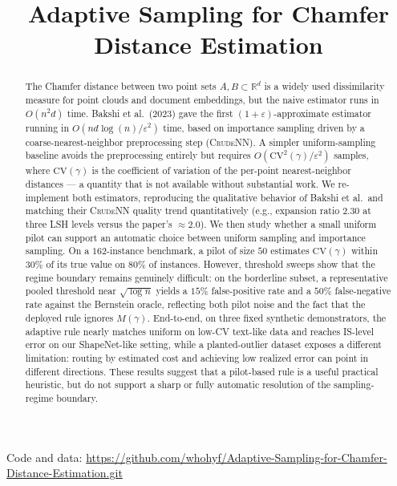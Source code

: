 \documentclass[conference]{IEEEtran}
\title{Adaptive Sampling for Chamfer Distance Estimation}
\author{
\IEEEauthorblockN{Cody Jiang}
\IEEEauthorblockA{
New York University\\
cody.jiang@nyu.edu}
\and
\IEEEauthorblockN{Yifan Hu}
\IEEEauthorblockA{
New York University\\
yh6416@nyu.edu}
}
\begin{document}
\maketitle

\begin{center}
\small
Code and data: \url{https://github.com/whohyf/Adaptive-Sampling-for-Chamfer-Distance-Estimation.git}
\end{center}

\begin{abstract}
The Chamfer distance between two point sets $A, B \subset \mathbb{R}^d$
is a widely used dissimilarity measure for point clouds and document
embeddings, but the naive estimator runs in $O(n^2 d)$ time. Bakshi
et al.\ (2023) gave the first $(1{+}\varepsilon)$-approximate estimator
running in $O(nd \log(n)/\varepsilon^2)$ time, based on importance
sampling driven by a coarse-nearest-neighbor preprocessing step
(\textsc{CrudeNN}). A simpler uniform-sampling baseline avoids the
preprocessing entirely but requires
$O(\mathrm{CV}^2(\gamma)/\varepsilon^2)$ samples, where
$\mathrm{CV}(\gamma)$ is the coefficient of variation of the per-point
nearest-neighbor distances --- a quantity that is not available
without substantial work. We re-implement both estimators, reproducing
the qualitative behavior of Bakshi et al.\ and matching their
\textsc{CrudeNN} quality trend quantitatively
(e.g., expansion ratio $2.30$ at three LSH levels versus the paper's
$\approx 2.0$). We then study whether a small uniform pilot can
support an automatic choice between uniform sampling and importance
sampling. On a $162$-instance benchmark, a pilot of size $50$
estimates $\mathrm{CV}(\gamma)$ within $30\%$ of its true value on
$80\%$ of instances. However, threshold sweeps show that the regime
boundary remains genuinely difficult: on the borderline subset, a
representative pooled threshold near $\sqrt{\log n}$ yields a
$15\%$ false-positive rate and a $50\%$ false-negative rate against
the Bernstein oracle, reflecting both pilot noise and the fact that
the deployed rule ignores $M(\gamma)$. End-to-end, on three fixed
synthetic demonstrators, the adaptive rule nearly matches uniform on
low-CV text-like data and reaches IS-level error on our ShapeNet-like
setting, while a planted-outlier dataset exposes a different
limitation: routing by estimated cost and achieving low realized error
can point in different directions. These results suggest that a
pilot-based rule is a useful practical heuristic, but do not support a
sharp or fully automatic resolution of the sampling-regime boundary.
\end{abstract}
\end{document}
